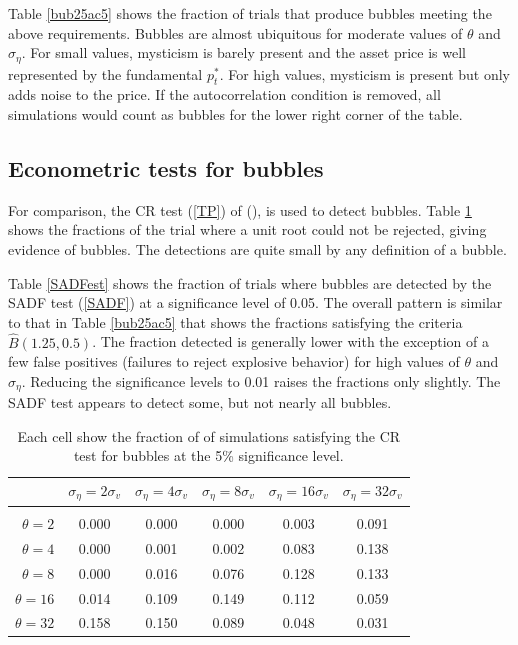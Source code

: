 \documentclass[12pt]{article}
\begin{document}
Table \ref{bub25ac5} shows the fraction of trials that produce bubbles meeting the above requirements. Bubbles are almost ubiquitous for moderate values of $\theta$ and $\sigma_{\eta}$. For small values, mysticism is barely present and the asset price is well represented by the fundamental $p^{*}_{t}$. For high values, mysticism is present but only adds noise to the price. If the autocorrelation condition is removed, all simulations would count as bubbles for the lower right corner of the table. 

\subsection{Econometric tests for bubbles}

For comparison, the CR test (\ref{TP}) of \citeauthor{TaylorPeel1998} (\citeyear{TaylorPeel1998}), is used to detect bubbles. Table \ref{CRtest} shows the fractions of the trial where a unit root could not be rejected, giving evidence of bubbles. The detections are quite small by any definition of a bubble.

Table \ref{SADFest} shows the fraction of trials where bubbles are detected by the SADF test (\ref{SADF}) at a significance level of 0.05. The overall pattern is similar to that in Table \ref{bub25ac5} that shows the fractions satisfying the criteria $\widehat{B}(1.25,0.5)$. The fraction detected is generally lower with the exception of a few false positives (failures to reject explosive behavior) for high values of $\theta$ and $\sigma_{\eta}$. Reducing the significance levels to 0.01 raises the fractions only slightly. The SADF test appears to detect some, but not nearly all bubbles.

\begin{table}[]
    \centering
\begin{tabular}{rccccc}
\hline  
            & \multicolumn{1}{l}{$\sigma_{\eta} =2\sigma_{v}$} & \multicolumn{1}{l}{$\sigma_{\eta} =4\sigma_{v}$} & \multicolumn{1}{l}{$\sigma_{\eta} =8\sigma_{v}$} & \multicolumn{1}{l}{$\sigma_{\eta} =16\sigma_{v}$} & \multicolumn{1}{l}{$\sigma_{\eta} =32\sigma_{v}$} \\ \hline  \vspace{-3mm} \\        
$\theta=2$                     & 0.000 & 0.000 & 0.000 & 0.003  & 0.091  \\ \hline
$\theta=4$                    & 0.000 & 0.001 & 0.002 & 0.083  & 0.138  \\ \hline
$\theta=8$                  & 0.000 & 0.016 & 0.076 & 0.128  & 0.133  \\ \hline
$\theta=16$                & 0.014 & 0.109 & 0.149 & 0.112  & 0.059  \\ \hline
$\theta=32$                & 0.158 & 0.150 & 0.089 & 0.048  & 0.031  \\ \hline
\end{tabular}
\caption{Each cell show the fraction of of simulations satisfying the CR test for bubbles at the 5\% significance level.}
\label{CRtest}
\end{table}
\end{document}
